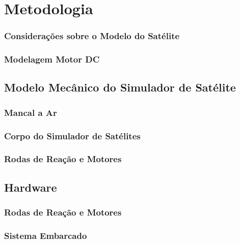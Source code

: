 \chapter{Metodologia}

\subsection{Considerações sobre o Modelo do Satélite}

\subsection{Modelagem Motor DC}

\section{Modelo Mecânico do Simulador de Satélite}

\subsection{Mancal a Ar}

\subsection{Corpo do Simulador de Satélites}

\subsection{Rodas de Reação e Motores}

\section{Hardware}

\subsection{Rodas de Reação e Motores}

\subsection{Sistema Embarcado}

